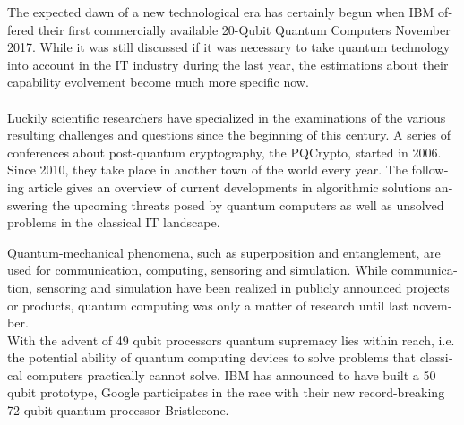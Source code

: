 \documentclass[a4paper,11pt]{article}
\begin{document}
\begin{otherlanguage}{english}

\vspace{3mm}
\begin{multicols}{2}
\noindent


The expected dawn of a new technological era has certainly begun when IBM offered their first commercially available 20-Qubit Quantum Computers November 2017.
While it was still discussed if it was necessary to take quantum technology into account in the IT industry during the last year, the estimations about their capability evolvement become much more specific now.\\ \\
Luckily scientific researchers have specialized in the examinations of the various resulting challenges and questions since the beginning of this century. A series of conferences about post-quantum cryptography, the PQCrypto, started in 2006. Since 2010, they take place in another town of the world every year. The following article gives an overview of current developments in algorithmic solutions answering the upcoming threats posed by quantum computers as well as unsolved problems in the classical IT landscape. 

Quantum-mechanical phenomena, such as superposition and entanglement, are used for communication, computing, sensoring and simulation. While communication, sensoring and simulation have been realized in publicly announced projects or products, quantum computing was only a matter of research until last november. \\
With the advent of 49 qubit processors quantum supremacy lies within reach, i.e. the potential ability of quantum computing devices to solve problems that classical computers practically cannot solve\cite{IEEESpec, googleai}. IBM has announced to have built a 50 qubit prototype, Google participates in the race with their new record-breaking 72-qubit quantum processor Bristlecone.


\end{multicols}
\end{otherlanguage}
\end{document}
